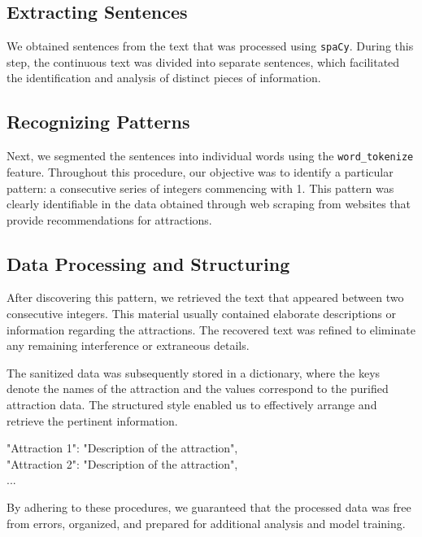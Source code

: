 \documentclass[conference]{IEEEtran}
\begin{document}
    \subsection{Extracting Sentences}
        We obtained sentences from the text that was processed using \texttt{spaCy}. During this step, the continuous text was divided into separate sentences, which facilitated the identification and analysis of distinct pieces of information.

    \subsection{Recognizing Patterns}
        Next, we segmented the sentences into individual words using the \texttt{word\_tokenize} feature. Throughout this procedure, our objective was to identify a particular pattern: a consecutive series of integers commencing with 1. This pattern was clearly identifiable in the data obtained through web scraping from websites that provide recommendations for attractions.

    \subsection{Data Processing and Structuring}
        After discovering this pattern, we retrieved the text that appeared between two consecutive integers. This material usually contained elaborate descriptions or information regarding the attractions. The recovered text was refined to eliminate any remaining interference or extraneous details.

    The sanitized data was subsequently stored in a dictionary, where the keys denote the names of the attraction and the values correspond to the purified attraction data. The structured style enabled us to effectively arrange and retrieve the pertinent information.

    \begin{tcolorbox}[linewidth=1pt, innerleftmargin=15pt, innerrightmargin=15pt, innertopmargin=15pt, innerbottommargin=15pt]
    "Attraction 1": "Description of the attraction",\\
    "Attraction 2": "Description of the attraction",\\
    ...
    \end{tcolorbox}

    By adhering to these procedures, we guaranteed that the processed data was free from errors, organized, and prepared for additional analysis and model training.
\end{document}
